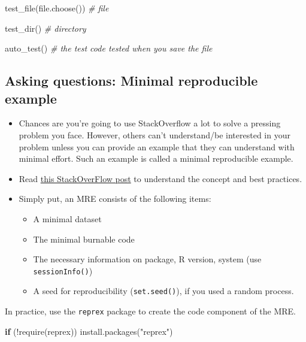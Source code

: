 \documentclass[
]{book}
\newenvironment{Shaded}{\begin{snugshade}}{\end{snugshade}}
\newcommand{\CommentTok}[1]{\textcolor[rgb]{0.56,0.35,0.01}{\textit{#1}}}
\newcommand{\ControlFlowTok}[1]{\textcolor[rgb]{0.13,0.29,0.53}{\textbf{#1}}}
\newcommand{\FunctionTok}[1]{\textcolor[rgb]{0.00,0.00,0.00}{#1}}
\newcommand{\NormalTok}[1]{#1}
\newcommand{\SpecialCharTok}[1]{\textcolor[rgb]{0.00,0.00,0.00}{#1}}
\newcommand{\StringTok}[1]{\textcolor[rgb]{0.31,0.60,0.02}{#1}}
\providecommand{\tightlist}{%
  \setlength{\itemsep}{0pt}\setlength{\parskip}{0pt}}
\begin{document}
\begin{Shaded}
\begin{Highlighting}[]
\FunctionTok{test\_file}\NormalTok{(}\FunctionTok{file.choose}\NormalTok{()) }\CommentTok{\# file }

\FunctionTok{test\_dir}\NormalTok{() }\CommentTok{\# directory}

\FunctionTok{auto\_test}\NormalTok{() }\CommentTok{\# the test code tested when you save the file }
\end{Highlighting}
\end{Shaded}

\hypertarget{asking-questions-minimal-reproducible-example}{%
\subsection{Asking questions: Minimal reproducible example}\label{asking-questions-minimal-reproducible-example}}

\begin{itemize}
\item
  Chances are you're going to use StackOverflow a lot to solve a pressing problem you face. However, others can't understand/be interested in your problem unless you can provide an example that they can understand with minimal effort. Such an example is called a minimal reproducible example.
\item
  Read \href{https://stackoverflow.com/questions/5963269/how-to-make-a-great-r-reproducible-example}{this StackOverFlow post} to understand the concept and best practices.
\item
  Simply put, an MRE consists of the following items:

  \begin{itemize}
  \tightlist
  \item
    A minimal dataset
  \item
    The minimal burnable code
  \item
    The necessary information on package, R version, system (use \texttt{sessionInfo()})
  \item
    A seed for reproducibility (\texttt{set.seed()}), if you used a random process.
  \end{itemize}
\end{itemize}

In practice, use the \texttt{reprex} package to create the code component of the MRE.

\begin{Shaded}
\begin{Highlighting}[]
\ControlFlowTok{if}\NormalTok{ (}\SpecialCharTok{!}\FunctionTok{require}\NormalTok{(reprex)) }\FunctionTok{install.packages}\NormalTok{(}\StringTok{"reprex"}\NormalTok{)}
\end{Highlighting}
\end{Shaded}
\end{document}
